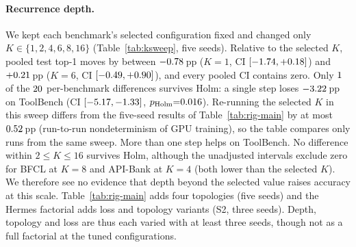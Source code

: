 \documentclass[10pt,twocolumn,letterpaper]{article}
\begin{document}
\begin{table}[t]
\centering
\small
\setlength{\tabcolsep}{8pt}
\caption{Recurrence depth: test top-1 (\%, mean\,$\pm$\,SD over five seeds) of the tuned tree GNCA with only the number of weight-tied steps $K$ changed. Bold: the benchmark's selected $K$, re-run in the same sweep; every other cell is compared with it (paired bootstrap, Holm over $\numKswNPairs$; $^{\ast}$\,$p_{\text{Holm}}{<}0.05$). Pooled $\Delta$: DerSimonian--Laird over the benchmarks where that $K$ is not the selected one. Source S8b.}
\label{tab:ksweep}

\end{table}

\paragraph{Recurrence depth.} We kept each benchmark's selected configuration fixed and changed only $K \in \{1,2,4,6,8,16\}$ (Table~\ref{tab:ksweep}, five seeds). Relative to the selected $K$, pooled test top-1 moves by between $-0.78$\,pp ($K{=}1$, CI $[-1.74, +0.18]$) and $+0.21$\,pp ($K{=}6$, CI $[-0.49, +0.90]$), and every pooled CI contains zero. Only $1$ of the $\numKswNPairs$ per-benchmark differences survives Holm: a single step loses $-3.22$\,pp on ToolBench (CI $[-5.17, -1.33]$, $p_{\text{Holm}}{=}0.016$). Re-running the selected $K$ in this sweep differs from the five-seed results of Table~\ref{tab:rig-main} by at most $0.52$\,pp (run-to-run nondeterminism of GPU training), so the table compares only runs from the same sweep. More than one step helps on ToolBench. No difference within $2 \le K \le 16$ survives Holm, although the unadjusted intervals exclude zero for BFCL at $K{=}8$ and API-Bank at $K{=}4$ (both lower than the selected $K$). We therefore see no evidence that depth beyond the selected value raises accuracy at this scale. Table~\ref{tab:rig-main} adds four topologies (five seeds) and the Hermes factorial adds loss and topology variants (S2, three seeds). Depth, topology and loss are thus each varied with at least three seeds, though not as a full factorial at the tuned configurations.
\end{document}
